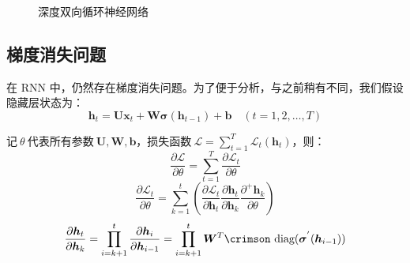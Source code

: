 \documentclass[12pt,a4paper]{article}
\begin{document}
\begin{figure}
\caption{\kai 深度双向循环神经网络}\label{fig:deepRNN}
\end{figure}

\subsection{梯度消失问题}

在 {\crimson RNN} 中，仍然存在梯度消失问题{\kai \cite{pascanu2012difficulty}}。为了便于分析，与之前稍有不同，我们假设隐藏层状态为：
\begin{equation}
\bm{h}_t = \bm{U}\bm{x}_t + \bm{W}\bm{\sigma}(\bm{h}_{t-1}) + \bm{b} \quad (t = 1,2,\ldots,T)
\end{equation}

记$\:\theta\:$代表所有参数$\:\bm{U},\bm{W},\bm{b}$，损失函数$\:\mathcal{L} =  \sum_{t=1}^{T} \mathcal{L}_t(\bm{h}_t)$，则：
\begin{equation}
\frac{\partial \mathcal{L}}{\partial \theta} = \sum_{t=1}^T \frac{\partial \mathcal{L}_t}{\partial \theta}
\end{equation}
\begin{equation}
\frac{\partial \mathcal{L}_t}{\partial \theta} = \sum_{k=1}^t \left( \frac{\partial \mathcal{L}_t}{\partial \bm{h}_t} \frac{\partial \bm{h}_t}{\partial \bm{h}_k} \frac{\partial^{+} \bm{h}_k}{\partial \theta} \right)
\end{equation}
\begin{equation}
\frac{\partial \bm{h}_t}{\partial \bm{h}_k} = \prod_{i=k+1}^t\frac{\partial \bm{h}_i}{\partial \bm{h}_{i - 1}} = \prod_{i=k+1}^t \bm{W}^{T}\text{\crimson diag}(\bm{\sigma}^{'}(\bm{h}_{i - 1}))
\end{equation}
\end{document}
